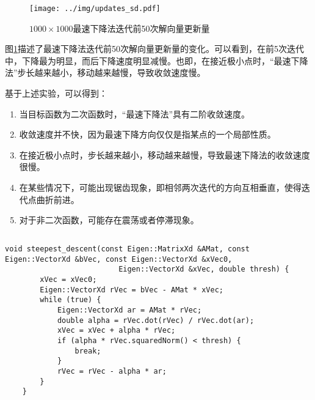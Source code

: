 \documentclass[12pt, onecolumn]{article}
\newcommand\normf{\fangsong}
\begin{document}
	\begin{figure}[h]
		\centering
		\texttt{[image: ../img/updates\_sd.pdf]}
		\caption{\normf $1000\times 1000$最速下降法迭代前50次解向量更新量}
		\label{fig:最速下降法迭代前50次解向量更新量}
	\end{figure}
	图\ref{fig:最速下降法迭代前50次解向量更新量}描述了最速下降法迭代前50次解向量更新量的变化。可以看到，在前5次迭代中，下降最为明显，而后下降速度明显减慢。也即，在接近极小点时，“最速下降法”步长越来越小，移动越来越慢，导致收敛速度慢。
				
		基于上述实验，可以得到：
		\begin{enumerate}
		\item 当目标函数为二次函数时，“最速下降法”具有二阶收敛速度。
		
		\item 收敛速度并不快，因为最速下降方向仅仅是指某点的一个局部性质。
		
		\item 在接近极小点时，步长越来越小，移动越来越慢，导致最速下降法的收敛速度很慢。
		
		\item 在某些情况下，可能出现锯齿现象，即相邻两次迭代的方向互相垂直，使得迭代点曲折前进。
		
		\item 对于非二次函数，可能存在震荡或者停滞现象。
		\end{enumerate}
	
	\subsection{\normf{关键代码}}
	\begin{lstlisting}[caption=\normf{最速下降法代码}]
    void steepest_descent(const Eigen::MatrixXd &AMat, const Eigen::VectorXd &bVec, const Eigen::VectorXd &xVec0,
                          Eigen::VectorXd &xVec, double thresh) {
        xVec = xVec0;
        Eigen::VectorXd rVec = bVec - AMat * xVec;
        while (true) {
            Eigen::VectorXd ar = AMat * rVec;
            double alpha = rVec.dot(rVec) / rVec.dot(ar);
            xVec = xVec + alpha * rVec;
            if (alpha * rVec.squaredNorm() < thresh) {
                break;
            }
            rVec = rVec - alpha * ar;
        }
    }
	\end{lstlisting}
	
	\newpage
	\section{\normf{共轭梯度下降}}
\end{document}
